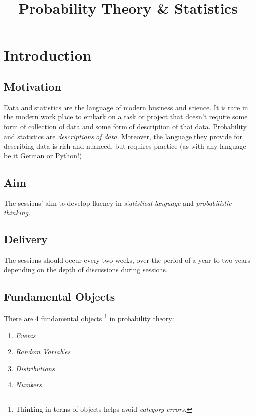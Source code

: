 \documentclass[11pt,a4paper]{article}
\title{Probability Theory \& Statistics}
\begin{document}
\maketitle
\newpage

\section{Introduction}

\subsection{Motivation}

Data and statistics are the language of modern business and science. 
It is rare in the modern work place to embark on a task or project that doesn't require 
some form of collection of data and some form of description of that data. 
Probability and statistics are \emph{descriptions of data}. 
Moreover, 
the language they provide for describing data is rich and nuanced, 
but requires practice (as with any language be it German or Python!)

\subsection{Aim}

The sessions' aim to develop fluency in \emph{statistical language} and \emph{probabilistic thinking}.

\subsection{Delivery}

The sessions should occur every two weeks,
over the period of a year to two years depending on the depth of discussions during sessions.

\subsection{Fundamental Objects}

There are 4 fundamental objects%
\footnote{Thinking in terms of objects helps avoid \emph{category errors}.}
in probability theory:

\begin{enumerate}
\def\labelenumi{\arabic{enumi}.}
\item \emph{Events}
\item \emph{Random Variables}
\item \emph{Distributions}
\item \emph{Numbers}
\end{enumerate}
\end{document}
